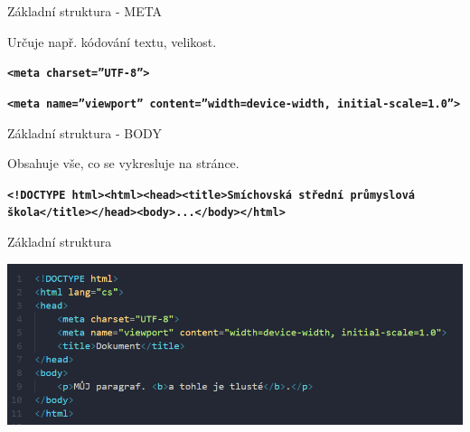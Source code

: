 \documentclass[aspectratio=1610]{beamer}
\begin{document}
\begin{frame}{Základní struktura - META}
    \begin{cardTiny}
        \begin{flushleft}
        Určuje např. kódování textu, velikost.
        \end{flushleft}
    \end{cardTiny}
    \begin{cardTiny}
        \begin{flushleft}
        \texttt{\textbf{<meta charset=''UTF-8''>}}
        
        \texttt{\textbf{<meta name=''viewport'' content=''width=device-width, initial-scale=1.0''>}}
        \end{flushleft}
    \end{cardTiny}
\end{frame}

\begin{frame}{Základní struktura - BODY}
    \begin{cardTiny}
        \begin{flushleft}
            Obsahuje vše, co se vykresluje na stránce.
        \end{flushleft}
    \end{cardTiny}
    \begin{cardTiny}
        \begin{flushleft}
        \texttt{\textbf{<!DOCTYPE html><html><head><title>Smíchovská střední průmyslová škola</title></head><body>...</body></html>}}
        \end{flushleft}
    \end{cardTiny}
\end{frame}

\begin{frame}{Základní struktura}
    \begin{center}
        \includegraphics[width=\textwidth]{img/html-6.png}
    \end{center}
\end{frame}
\end{document}
